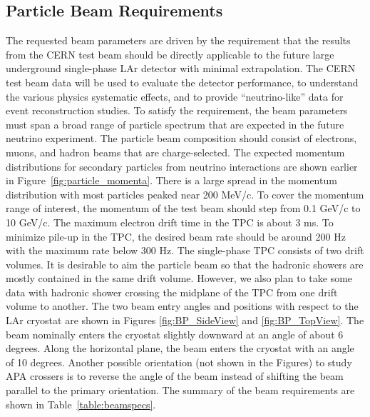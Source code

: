 
\subsection{Particle Beam Requirements}
The requested beam parameters are driven by the requirement that the results from the CERN test beam should be directly applicable to the future large underground single-phase LAr detector with minimal extrapolation. The CERN test beam data will be used to evaluate the detector performance, to understand the various physics systematic effects, and to provide ``neutrino-like'' data for event reconstruction studies. To satisfy the requirement, the beam parameters must span a broad range of particle spectrum that are expected in the future neutrino experiment. The particle beam composition should consist of electrons, muons, and hadron beams that are charge-selected. The expected momentum distributions for secondary particles from neutrino interactions are shown earlier in Figure~\ref{fig:particle_momenta}. There is a large spread in the momentum distribution with most particles peaked near 200 MeV/c. To cover the momentum range of interest, the momentum of the test beam should step from 0.1 GeV/c to 10 GeV/c. The maximum electron drift time in the TPC is about 3 ms. To minimize pile-up in the TPC, the desired beam rate should be around 200 Hz with the maximum rate below 300 Hz. The single-phase TPC consists of two drift volumes. It is desirable to aim the particle beam so that the hadronic showers are mostly contained in the same drift volume.  However, we also plan to take some data with hadronic shower crossing the midplane of the TPC from one drift volume to another.  The two beam entry angles and positions with respect to the LAr cryostat are shown in Figures \ref{fig:BP_SideView} and \ref{fig:BP_TopView}. The beam nominally enters the cryostat slightly downward at an angle of about 6 degrees. Along the horizontal plane, the beam enters the cryostat with an angle of 10 degrees.  Another possible orientation (not shown in the Figures) to study APA crossers is to reverse the angle of the beam instead of shifting the beam parallel to the primary orientation. The summary of the beam requirements are shown in Table~\ref{table:beamspecs}.

